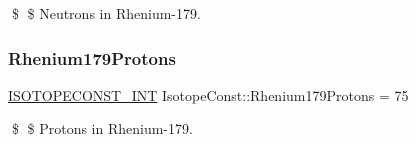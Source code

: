 \$ \$ Neutrons in Rhenium-\/179. \mbox{\label{group___isotope_const-_rhenium-_re179_gac6f4e41f4f919e32f729a0969de5e8c2}} 
\subsubsection{\texorpdfstring{Rhenium179\+Protons}{Rhenium179Protons}}
{\footnotesize\ttfamily \mbox{\hyperlink{group___isotope_const-_macros_ga5f18360b3e99483a35c32d789e62621c}{I\+S\+O\+T\+O\+P\+E\+C\+O\+N\+S\+T\+\_\+\+I\+NT}} Isotope\+Const\+::\+Rhenium179\+Protons = 75}

\$ \$ Protons in Rhenium-\/179. 